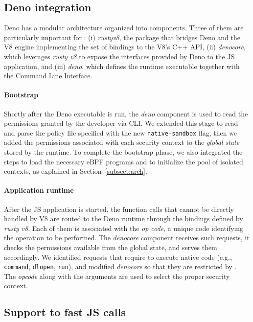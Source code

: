 \subsection{Deno integration}
\label{subsect:deno-integration}

Deno has a modular architecture organized into components. Three of
them are particularly important for \natisand: (i) {\em
  rusty\textunderscore v8}, the package that bridges Deno and the V8
engine implementing the set of bindings to the V8's C++ API, (ii) {\em
  deno\textunderscore core}, which leverages {\em rusty\textunderscore
  v8} to expose the interfaces provided by Deno to the JS application,
and (iii) {\em deno}, which defines the runtime executable together
with the Command Line Interface.

\paragraph{Bootstrap}
%
Shortly after the Deno executable is run, the {\em deno} component is
used to read the permissions granted by the developer via CLI. We
extended this stage to read and parse the policy file specified with
the new {\tt native-sandbox} flag, then we added the permissions
associated with each security context to the {\em global state} stored
by the runtime. To complete the bootstrap phase, we also integrated
the steps to load the necessary eBPF programs and to initialize the
pool of isolated contexts, as explained in Section~\ref{subsect:arch}.

\paragraph{Application runtime}
%
After the JS application is started, the function
calls that cannot be directly handled by V8 are routed to the Deno
runtime through the bindings defined by {\em rusty\textunderscore
  v8}. Each of them is associated with the {\em op\textunderscore
  code}, a unique code identifying the operation to be
performed. The {\em deno\textunderscore core} component receives such
requests, it checks the permissions available from the global state,
and serves them accordingly. We identified requests that
require to execute native code (e.g., {\tt command}, {\tt dlopen},
{\tt run}), and modified {\em deno\textunderscore core} so that they
are restricted by \natisand. The {\em op\textunderscore code} along
with the arguments are used to select the proper security context.


\subsection{Support to fast JS calls}
\label{subsect:fast-api}

